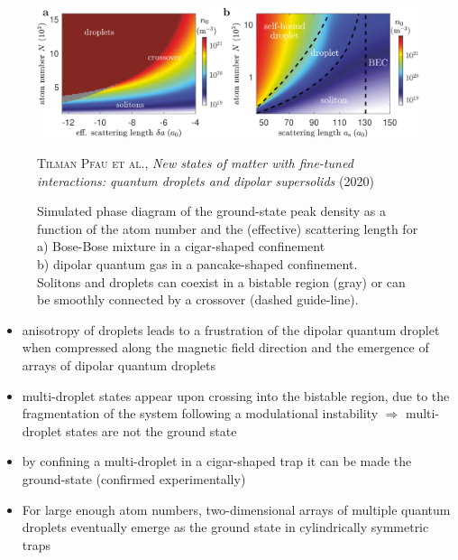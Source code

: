 \begin{figure}[H]
    \centering
    \includegraphics[width=1.0\textwidth]{IMAGE/droplet_soliton.png}\\
    \caption{
            Simulated phase diagram of the ground-state peak density as a function
            of the atom number and the (effective) scattering length for \\
            a) Bose-Bose mixture in a cigar-shaped confinement \\
            b) dipolar quantum gas in a pancake-shaped confinement. \\
               Solitons and droplets can coexist in a bistable region (gray) or can be smoothly connected by a crossover
               (dashed guide-line).
          }
    \textsc{Tilman Pfau et al.}, \emph{New states of matter with fine-tuned interactions:
        quantum droplets and dipolar supersolids} (2020)
    \label{fig:doplet_collision}
\end{figure}


\begin{itemize}
    \item anisotropy of droplets leads to a frustration of the dipolar quantum droplet when
compressed along the magnetic field direction and the emergence of arrays of dipolar
quantum droplets
    \item multi-droplet states appear upon crossing into the bistable region,
        due to the fragmentation of the system following a modulational instability
        $\Rightarrow$ multi-droplet states are not the ground state
    \item by confining a multi-droplet in a cigar-shaped trap it can be made the ground-state (confirmed experimentally)
    \item For large enough atom numbers, two-dimensional arrays of multiple quantum droplets
        eventually emerge as the ground state in cylindrically symmetric traps
\end{itemize}


